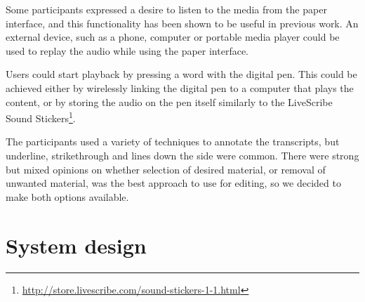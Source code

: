 Some participants expressed a desire to listen to the media from the paper interface, and this functionality has been
shown to be useful in previous work. %
An external device, such as a phone, computer or portable media player could be used to replay the audio while using
the paper interface.

Users could start playback by pressing a word with the digital pen. This could be
achieved either by wirelessly linking the digital pen to a computer that plays the content, or by storing the audio on
the pen itself similarly to the LiveScribe Sound
Stickers\footnote{\url{http://store.livescribe.com/sound-stickers-1-1.html}}.





The participants used a variety of techniques to annotate the transcripts, but underline, strikethrough and lines down
the side were common. There were strong but mixed opinions on whether selection of desired material, or removal of
unwanted material, was the best approach to use for editing, so we decided to make both options available.


\section{System design}\label{sec:paper-design}

